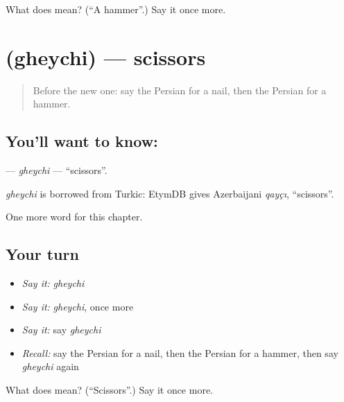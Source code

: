 \begin{tcolorbox}[breakable,colback=teal!4,colframe=teal!35!black,title={Before you move on}]
What does  mean? (\textquotedblleft{}A hammer\textquotedblright{}.) Say it once more.
\end{tcolorbox}
\section[\texorpdfstring{\fa{قیچی} (gheychi)}{قیچی (gheychi)}]{ (gheychi) — scissors}

\label{lesson:FA-C94-gheychi}



\begin{quote}
Before the new one: say the Persian for a nail, then the Persian for a hammer.
\end{quote}

\subsection*{You'll want to know: }
\textbf{} — \emph{gheychi} — \textquotedblleft{}scissors\textquotedblright{}.

\begin{cousinweb}
\emph{gheychi} is borrowed from Turkic: EtymDB gives Azerbaijani \emph{qayçı}, \textquotedblleft{}scissors\textquotedblright{}.
\end{cousinweb}

\begin{grammarlens}[title={What you've built}]
One more word for this chapter.
\end{grammarlens}

\subsection*{Your turn}
\begin{itemize}
\raggedright
  \item \emph{Say it:} \emph{gheychi}
  \item \emph{Say it:} \emph{gheychi}, once more
  \item \emph{Say it:} say \emph{gheychi}
  \item \emph{Recall:} say the Persian for a nail, then the Persian for a hammer, then say \emph{gheychi} again
\end{itemize}

\begin{tcolorbox}[breakable,colback=teal!4,colframe=teal!35!black,title={Before you move on}]
What does  mean? (\textquotedblleft{}Scissors\textquotedblright{}.) Say it once more.
\end{tcolorbox}
